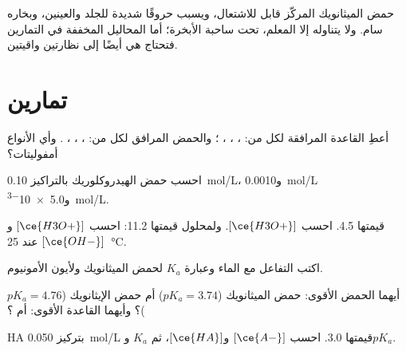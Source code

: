 \begin{safety}{}
حمض الميثانويك المركّز قابل للاشتعال، ويسبب حروقًا شديدة للجلد
والعينين، وبخاره سام. ولا يتناوله إلا المعلم،
تحت ساحبة الأبخرة؛ أما المحاليل المخففة في التمارين فتحتاج هي أيضًا إلى
نظارتين واقيتين.
\end{safety}

\section{تمارين}

\begin{exercise}[$\star$]\label{exo:g12:ka-and-pka:1}
أعطِ القاعدة المرافقة لكل من: ، ، ، ؛
والحمض المرافق لكل من: ، ، ، .
وأي الأنواع أمفوليتات؟
\end{exercise}

\begin{exercise}[$\star$]\label{exo:g12:ka-and-pka:2}
احسب  حمض الهيدروكلوريك بالتراكيز \qty{0.10}{mol/L}،
و\qty{0.0010}{mol/L} و\qty{5.0e-3}{mol/L}.
\end{exercise}

\begin{exercise}[$\star$]\label{exo:g12:ka-and-pka:3}
  قيمتها 4.5. احسب $[\ce{H3O+}]$. ولمحلول  قيمتها 11.2:
احسب $[\ce{H3O+}]$ و$[\ce{OH-}]$ عند \qty{25}{\celsius}.
\end{exercise}

\begin{exercise}[$\star$]\label{exo:g12:ka-and-pka:4}
اكتب التفاعل مع الماء وعبارة $K_a$ لحمض
الميثانويك ولأيون الأمونيوم.
\end{exercise}

\begin{exercise}[$\star$]\label{exo:g12:ka-and-pka:5}
أيهما الحمض الأقوى: حمض الميثانويك ($pK_a = 3.74$) أم حمض
الإيثانويك ($pK_a = 4.76$)؟ وأيهما القاعدة الأقوى:  أم
؟
\end{exercise}

\begin{exercise}[$\star\star$]\label{exo:g12:ka-and-pka:6}
  HA بتركيز \qty{0.050}{mol/L}  قيمتها 3.0. احسب
$[\ce{A-}]$ و$[\ce{HA}]$، ثم $K_a$ و$pK_a$.
\end{exercise}

